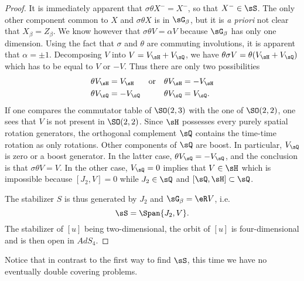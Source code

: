 \begin{proof}
	It is immediately apparent that $\sigma\theta X^-=X^-$, so that $X^-\in\sS$.  The only other component common to $X$ and $\sigma\theta X$ is in $\sG_{\beta}$, but   it is \emph{a priori} not clear that $X_{\beta}=Z_{\beta}$. We know however that $\sigma\theta V=\alpha V$ because $\sG_{\beta}$ has only one dimension. Using the fact that $\sigma$ and $\theta$ are commuting involutions, it is apparent that $\alpha=\pm 1$. Decomposing $V$ into $V=V_{\sH}+V_{\sQ}$, we have $\theta\sigma V=\theta(V_{\sH}+V_{\sQ})$ which has to be equal to $V$ or $-V$. Thus there are only two possibilities
	\begin{align*}
		\theta V_{\sH} & =V_{\sH}  & \text{or} &  & \theta V_{\sH} & =-V_{\sH} \\
		\theta V_{\sQ} & =-V_{\sQ} &           &  & \theta V_{\sQ} & =V_{\sQ}.
	\end{align*}
	If one compares the commutator table of $\SO(2,3)$ with the one of $\SO(2,2)$, one sees that $V$ is not present in $\SO(2,2)$. Since $\sH$ possesses every purely spatial rotation generators, the orthogonal complement $\sQ$ contains the time-time rotation as only rotations. Other components of $\sQ$ are boost. In particular, $V_{\sQ}$ is zero or a boost generator. In the latter case, $\theta V_{\sQ}=-V_{\sQ}$, and the conclusion is that $\sigma\theta V=V$. In the other case, $V_{\sQ}=0$ implies that $V\in\sH$ which is impossible because $[J_2,V]=0$ while $J_2\in\sQ$ and $[\sQ,\sH]\subset\sQ$.



	The stabilizer $S$ is thus generated by $J_2$ and $\sG_{\beta}=\eR V$, i.e.
	\begin{equation}
		\sS=\Span\{ J_2,V \}.
	\end{equation}
	The stabilizer of $[u]$ being two-dimensional, the orbit of $[u]$ is four-dimensional and is then open in $AdS_4$.

\end{proof}

Notice that in contrast to the first way to find $\sS$, this time we have no eventually double covering problems.

